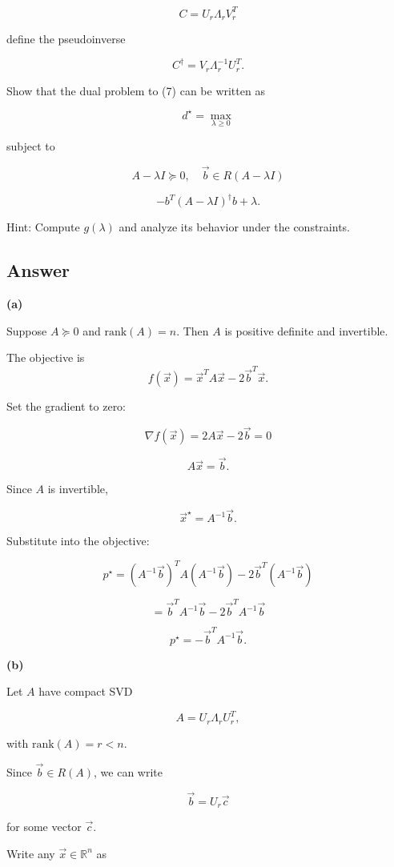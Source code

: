 \documentclass[
	12pt,
]{fphw}
\begin{document}
\begin{enumerate}
\[
C = U_r\Lambda_rV_r^T
\]

define the pseudoinverse

\[
C^\dagger = V_r\Lambda_r^{-1}U_r^T.
\]

Show that the dual problem to (7) can be written as

\[
d^\star = \max_{\lambda\ge0}
\]

subject to

\[
A-\lambda I\succeq0,\quad \vec{b}\in R(A-\lambda I)
\]

\[
-b^T(A-\lambda I)^\dagger b + \lambda.
\]

Hint: Compute $g(\lambda)$ and analyze its behavior under the constraints.
\end{enumerate}

\subsection*{Answer}

\textbf{(a)}

Suppose $A \succeq 0$ and $\mathrm{rank}(A)=n$. Then $A$ is positive definite and invertible.

The objective is
\[
f(\vec{x}) = \vec{x}^T A \vec{x} - 2\vec{b}^T \vec{x}.
\]

Set the gradient to zero:

\[
\nabla f(\vec{x}) = 2A\vec{x} - 2\vec{b} = 0
\]

\[
A\vec{x} = \vec{b}.
\]

Since $A$ is invertible,

\[
\vec{x}^\star = A^{-1}\vec{b}.
\]

Substitute into the objective:

\[
p^\star
= (A^{-1}\vec{b})^T A (A^{-1}\vec{b}) - 2\vec{b}^T(A^{-1}\vec{b})
\]

\[
= \vec{b}^T A^{-1}\vec{b} - 2\vec{b}^T A^{-1}\vec{b}
\]

\[
p^\star = -\vec{b}^T A^{-1}\vec{b}.
\]

\textbf{(b)}

Let $A$ have compact SVD

\[
A = U_r \Lambda_r U_r^T,
\]

with $\mathrm{rank}(A)=r<n$.

Since $\vec{b}\in R(A)$, we can write

\[
\vec{b} = U_r \vec{c}
\]

for some vector $\vec{c}$.

Write any $\vec{x}\in\mathbb{R}^n$ as
\end{document}
